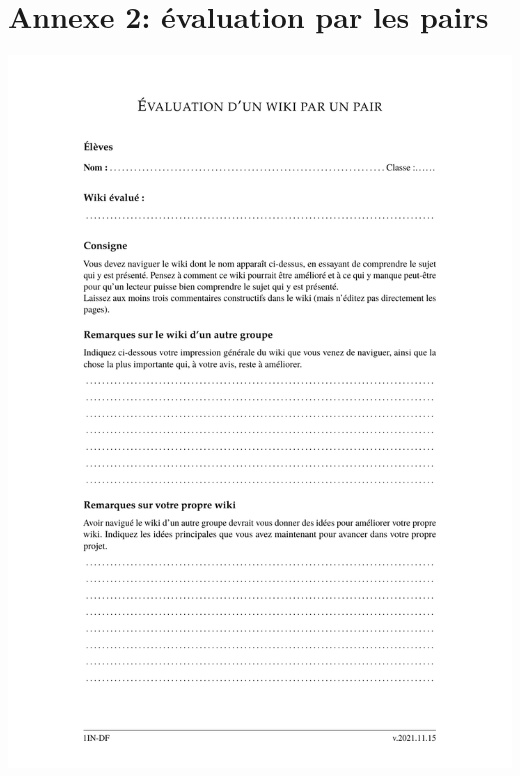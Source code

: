 \documentclass[11pt,bibliography=totoc]{scrartcl}
\begin{document}
\section*{Annexe 2: évaluation par les pairs} %
\includegraphics[width=.95\textwidth]{pairs.pdf}
\end{document}
